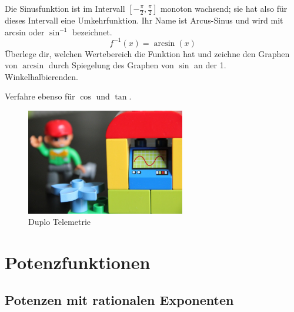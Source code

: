 \documentclass[%
11pt,%
twoside,%
titlepage,%
german,%
headsepline%
]{scrartcl}
\begin{document}
\begin{ueb}[ArcSin]
Die Sinusfunktion ist im Intervall $[-\frac{\pi}{2},\frac{\pi}{2}]$ monoton wachsend; sie hat also für dieses Intervall eine Umkehrfunktion. Ihr Name ist Arcus-Sinus und wird mit arcsin oder $\sin^{-1}$ bezeichnet.
$$f^{-1}(x)=\arcsin(x)$$
Überlege dir, welchen Wertebereich die Funktion hat und zeichne den Graphen von $\arcsin$ durch Spiegelung des Graphen von $\sin$ an der 1. Winkelhalbierenden.

\noindent Verfahre ebenso für $\cos$ und $\tan$.
\end{ueb}

\begin{figure}
\begin{center}
\includegraphics[width=0.618\textwidth]{pictures/telemetrie}
\end{center}
\caption{Duplo Telemetrie}
\end{figure}
 
\section{Potenzfunktionen}
  
\subsection{Potenzen mit rationalen Exponenten}
\end{document}
